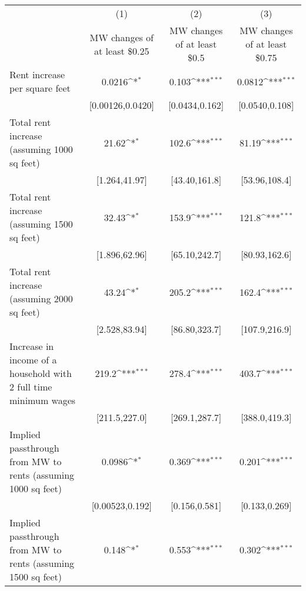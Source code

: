 {
\def\sym#1{\ifmmode^{#1}\else\(^{#1}\)\fi}
\begin{tabular}{l*{3}{c}}
\hline\hline
            &\multicolumn{1}{c}{(1)}        &\multicolumn{1}{c}{(2)}        &\multicolumn{1}{c}{(3)}        \\
            &\multicolumn{1}{c}{MW changes of at least \$0.25}&\multicolumn{1}{c}{MW changes of at least \$0.5}&\multicolumn{1}{c}{MW changes of at least \$0.75}\\
\hline
Rent increase per square feet&                0.0216\sym{*}  &                 0.103\sym{***}&                0.0812\sym{***}\\
            &      [0.00126,0.0420]         &        [0.0434,0.162]         &        [0.0540,0.108]         \\
[1em]
Total rent increase (assuming 1000 sq feet)&                 21.62\sym{*}  &                 102.6\sym{***}&                 81.19\sym{***}\\
            &         [1.264,41.97]         &         [43.40,161.8]         &         [53.96,108.4]         \\
[1em]
Total rent increase (assuming 1500 sq feet)&                 32.43\sym{*}  &                 153.9\sym{***}&                 121.8\sym{***}\\
            &         [1.896,62.96]         &         [65.10,242.7]         &         [80.93,162.6]         \\
[1em]
Total rent increase (assuming 2000 sq feet)&                 43.24\sym{*}  &                 205.2\sym{***}&                 162.4\sym{***}\\
            &         [2.528,83.94]         &         [86.80,323.7]         &         [107.9,216.9]         \\
[1em]
Increase in income of a household with 2 full time minimum wages&                 219.2\sym{***}&                 278.4\sym{***}&                 403.7\sym{***}\\
            &         [211.5,227.0]         &         [269.1,287.7]         &         [388.0,419.3]         \\
[1em]
Implied passthrough from MW to rents (assuming 1000 sq feet)&                0.0986\sym{*}  &                 0.369\sym{***}&                 0.201\sym{***}\\
            &       [0.00523,0.192]         &         [0.156,0.581]         &         [0.133,0.269]         \\
[1em]
Implied passthrough from MW to rents (assuming 1500 sq feet)&                 0.148\sym{*}  &                 0.553\sym{***}&                 0.302\sym{***}\\

\end{tabular}}

